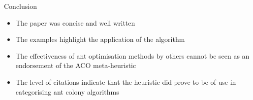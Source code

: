 \documentclass[aspectratio=169]{beamer}
\begin{document}
    \begin{frame}{Conclusion}
        \begin{itemize}
            \item The paper was concise and well written
            \item The examples highlight the application of the algorithm
            \item The effectiveness of ant optimisation methods by others cannot be seen as an endorsement of the ACO meta-heuristic
            \item The level of citations indicate that the heuristic did prove to be of use in categorising ant colony algorithms
        \end{itemize}
    \end{frame}
\end{document}

